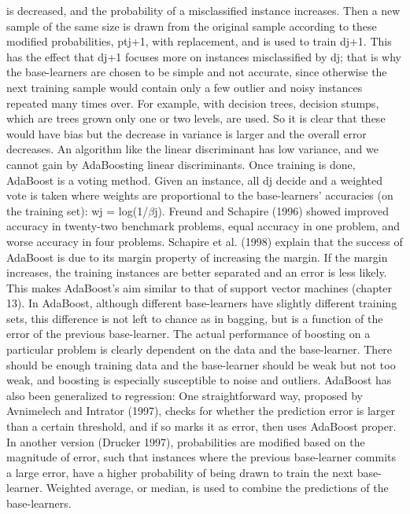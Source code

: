 is decreased, and the probability of a misclassified instance increases. Then a new sample of the same size is drawn from the original sample according to these modified probabilities, ptj+1, with replacement, and is used to train dj+1. This has the effect that dj+1 focuses more on instances misclassified by dj; that is why the base-learners are chosen to be simple and not accurate, since otherwise the next training sample would contain only a few outlier and noisy instances repeated many times over. For example, with decision trees, decision stumps, which are trees grown only one or two levels, are used. So it is clear that these would have bias but the decrease in variance is larger and the overall error decreases. An algorithm like the linear discriminant has low variance, and we cannot gain by AdaBoosting linear discriminants. Once training is done, AdaBoost is a voting method. Given an instance, all dj decide and a weighted vote is taken where weights are proportional to the base-learners’ accuracies (on the training set): wj = log(1/$\beta$j). Freund and Schapire (1996) showed improved accuracy in twenty-two benchmark problems, equal accuracy in one problem, and worse accuracy in four problems. Schapire et al. (1998) explain that the success of AdaBoost is due to its margin property of increasing the margin. If the margin increases, the training instances are better separated and an error is less likely. This makes AdaBoost’s aim similar to that of support vector machines (chapter 13). In AdaBoost, although different base-learners have slightly different training sets, this difference is not left to chance as in bagging, but is a function of the error of the previous base-learner. The actual performance of boosting on a particular problem is clearly dependent on the data and the base-learner. There should be enough training data and the base-learner should be weak but not too weak, and boosting is especially susceptible to noise and outliers. AdaBoost has also been generalized to regression: One straightforward way, proposed by Avnimelech and Intrator (1997), checks for whether the prediction error is larger than a certain threshold, and if so marks it as error, then uses AdaBoost proper. In another version (Drucker 1997), probabilities are modified based on the magnitude of error, such that instances where the previous base-learner commits a large error, have a higher probability of being drawn to train the next base-learner. Weighted average, or median, is used to combine the predictions of the base-learners.

